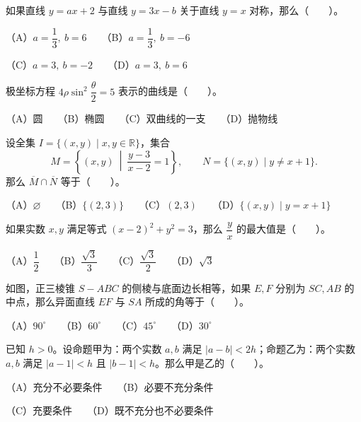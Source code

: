 \begin{question}
如果直线 $y=ax+2$ 与直线 $y=3x-b$ 关于直线 $y=x$ 对称，那么\mbox{（　　）}。

（A）$a=\dfrac13,\ b=6$　　（B）$a=\dfrac13,\ b=-6$

（C）$a=3,\ b=-2$　　（D）$a=3,\ b=6$

\end{question}
\begin{question}
极坐标方程 $4\rho\sin^2\dfrac\theta2=5$ 表示的曲线是\mbox{（　　）}。

（A）圆　　（B）椭圆　　（C）双曲线的一支　　（D）抛物线

\end{question}
\begin{question}
设全集 $I=\{(x,y)\mid x,y\in\mathbb R\}$，集合
\nopagebreak[4]
\[
M=\left\{(x,y)\ \middle|\ \frac{y-3}{x-2}=1\right\},\qquad N=\{(x,y)\mid y\ne x+1\}.
\]
那么 $\overline{M}\cap\overline{N}$ 等于\mbox{（　　）}。

（A）$\varnothing$　　（B）$\{(2,3)\}$　　（C）$(2,3)$　　（D）$\{(x,y)\mid y=x+1\}$

\end{question}
\begin{question}
如果实数 $x,y$ 满足等式 $(x-2)^2+y^2=3$，那么 $\dfrac yx$ 的最大值是\mbox{（　　）}。

（A）$\dfrac12$　　（B）$\dfrac{\sqrt3}{3}$　　（C）$\dfrac{\sqrt3}{2}$　　（D）$\sqrt3$

\Needspace{0.4\textheight}
\end{question}
\begin{question}
如图，正三棱锥 $S-ABC$ 的侧棱与底面边长相等，如果 $E,F$ 分别为 $SC,AB$ 的中点，那么异面直线 $EF$ 与 $SA$ 所成的角等于\mbox{（　　）}。
\nopagebreak[4]
\begin{center}\end{center}
\nopagebreak[4]
（A）$90^\circ$　　（B）$60^\circ$　　（C）$45^\circ$　　（D）$30^\circ$

\end{question}
\begin{question}
已知 $h>0$。设命题甲为：两个实数 $a,b$ 满足 $|a-b|<2h$；命题乙为：两个实数 $a,b$ 满足 $|a-1|<h$ 且 $|b-1|<h$。那么甲是乙的\mbox{（　　）}。

（A）充分不必要条件　　（B）必要不充分条件

（C）充要条件　　（D）既不充分也不必要条件

\end{question}
